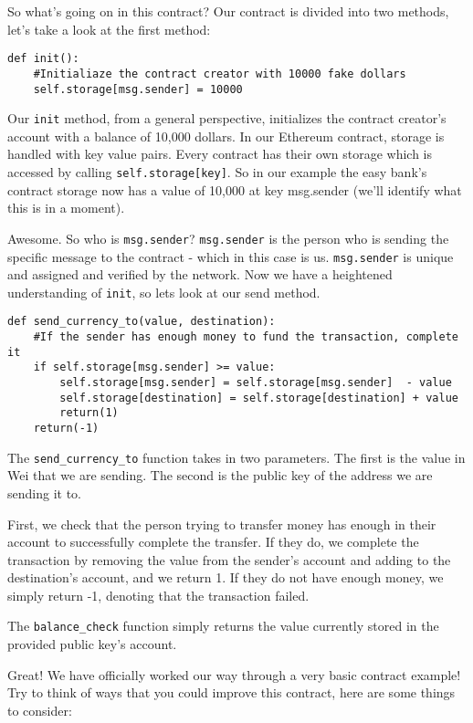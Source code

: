 \documentclass[12pt]{article}
\begin{document}
		
So what's going on in this contract?
Our contract is divided into two methods, let's take a look at the first method:

\begin{verbatim}
def init():
	#Initialiaze the contract creator with 10000 fake dollars
	self.storage[msg.sender] = 10000
\end{verbatim}
 
Our \texttt{init} method, from a general perspective, initializes the contract creator's account with a balance of 10,000 dollars. In our Ethereum contract, storage is handled with key value pairs. Every contract has their own storage which is accessed by calling \texttt{self.storage[key]}. So in our example the easy bank's contract storage now has a value of 10,000 at key msg.sender (we'll identify what this is in a moment).

 Awesome. So who is \texttt{msg.sender}? \texttt{msg.sender} is the person who is sending the specific message to the contract - which in this case is us. \texttt{msg.sender} is unique and assigned and verified by the network. Now we have a heightened understanding of \texttt{init}, so lets look at our send method.

\begin{verbatim}
def send_currency_to(value, destination):
	#If the sender has enough money to fund the transaction, complete it
	if self.storage[msg.sender] >= value:
		self.storage[msg.sender] = self.storage[msg.sender]  - value
		self.storage[destination] = self.storage[destination] + value
		return(1)
	return(-1)
\end{verbatim}

The \texttt{send\_currency\_to} function takes in two parameters. The first is the value in Wei that we are sending. The second is the public key of the address we are sending it to. 

First, we check that the person trying to transfer money has enough in their account to successfully complete the transfer. If they do, we complete the transaction by removing the value from the sender's account and adding to the destination's account, and we return 1. If they do not have enough money, we simply return -1, denoting that the transaction failed. 

The \texttt{balance\_check} function simply returns the value currently stored in the provided public key's account. 

Great! We have officially worked our way through a very basic contract example! Try to think of ways that you could improve this contract, here are some things to consider:
\end{document}
